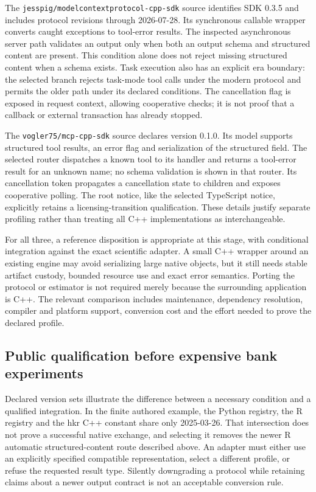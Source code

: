 The \texttt{jesspig/modelcontextprotocol-cpp-sdk} source identifies SDK 0.3.5
and includes protocol revisions through 2026-07-28. Its synchronous callable
wrapper converts caught exceptions to tool-error results. The inspected
asynchronous server path validates an output only when both an output schema
and structured content are present. This condition alone does not reject
missing structured content when a schema exists. Task execution also has
an explicit era boundary: the selected branch rejects task-mode tool calls
under the modern protocol and permits the older path under its declared
conditions. The cancellation flag is exposed in request context, allowing
cooperative checks; it is not proof that a callback or external transaction
has already stopped.~\citep{exec24_mcp_cpp_jesspig}

The \texttt{vogler75/mcp-cpp-sdk} source declares version 0.1.0. Its model
supports structured tool results, an error flag and serialization of the
structured field. The selected router dispatches a known tool to its handler
and returns a tool-error result for an unknown name; no schema validation is
shown in that router. Its cancellation token propagates a cancellation state
to children and exposes cooperative polling. The root notice, like the
selected TypeScript notice, explicitly retains a licensing-transition
qualification. These details justify separate profiling rather than treating
all C++ implementations as interchangeable.
\citep{exec24_mcp_cpp_vogler}

For all three, a reference disposition is appropriate at this stage, with
conditional integration against the exact scientific adapter. A small C++
wrapper around an existing engine may avoid serializing large native objects,
but it still needs stable artifact custody, bounded resource use and exact
error semantics. Porting the protocol or estimator is not required merely
because the surrounding application is C++. The relevant comparison includes
maintenance, dependency resolution, compiler and platform support, conversion
cost and the effort needed to prove the declared profile.
\citep{exec24_mcp_contracts}

\subsection{Public qualification before expensive bank experiments}

Declared version sets illustrate the difference between a necessary condition
and a qualified integration. In the finite authored example, the Python
registry, the R registry and the hkr C++ constant share only 2025-03-26.
That intersection does not prove a successful native exchange, and selecting
it removes the newer R automatic structured-content route described above.
An adapter must either use an explicitly specified compatible representation,
select a different profile, or refuse the requested result type. Silently
downgrading a protocol while retaining claims about a newer output contract
is not an acceptable conversion rule.~\citep{exec24_mcp_python,
exec24_mcp_r,exec24_mcp_cpp_hkr,exec24_mcp_contracts}

